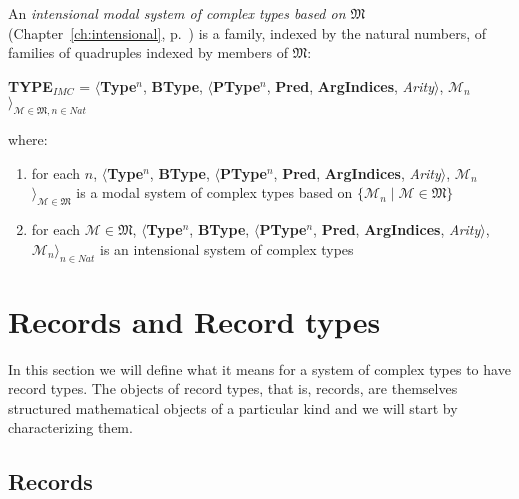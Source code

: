 An {\it intensional modal system of complex types based on
  $\mathfrak{M}$\/} (Chapter~\ref{ch:intensional}, p.~\pageref{ex:intensional-modal-type-sys}) is a family,
indexed by the natural numbers, of families of quadruples indexed by
members of $\mathfrak{M}$:
\begin{display}
{\bf TYPE$_\mathit{IMC}$} = $\langle${\bf Type}$^n$, {\bf BType},
$\langle$\textbf{PType}$^n$, {\bf Pred}, \textbf{ArgIndices}, {\it
  Arity\/}$\rangle$, $\mathscr{M}_n$$\rangle_{\mathscr{M}\in\mathfrak{M},n\in\mathit{Nat}}$
\end{display}
where:
\begin{enumerate} 
 
\item for each $n$, $\langle${\bf Type}$^n$, {\bf BType},
$\langle$\textbf{PType}$^n$, {\bf Pred}, \textbf{ArgIndices}, {\it
  Arity\/}$\rangle$, $\mathscr{M}_n$$\rangle_{\mathscr{M}\in\mathfrak{M}}$ is a modal
  system of complex types based on $\{\mathscr{M}_n\mid \mathscr{M}\in\mathfrak{M}\}$ 
 
\item for each $\mathscr{M}\in\mathfrak{M}$, $\langle${\bf Type}$^n$, {\bf BType},
$\langle$\textbf{PType}$^n$, {\bf Pred}, \textbf{ArgIndices}, {\it
  Arity\/}$\rangle$, $\mathscr{M}_n$$\rangle_{n\in\mathit{Nat}}$ is an
  intensional system of complex types
 
\end{enumerate} 
 


\section{Records and Record types}
\label{app:rectypes}



In this section we will define what it means for a system of complex
types to have record types.  The objects of record types, that is,
records, are themselves structured mathematical objects of a
particular kind and we will
start by characterizing them.

\subsection{Records}
\label{app:rec}


